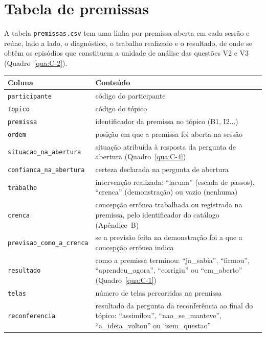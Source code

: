 \section{Tabela de premissas}

A tabela \texttt{premissas.csv} tem uma linha por premissa aberta em cada sessão e reúne, lado a lado, o diagnóstico, o trabalho realizado e o resultado, de onde se obtêm os episódios que constituem a unidade de análise das questões V2 e V3 (Quadro~\ref{qua:C-2}).

\begin{quadro}[htbp]
\caption{Colunas de \texttt{premissas.csv}}\label{qua:C-2}
\footnotesize
\begin{tabularx}{\textwidth}{|X|X|}
\hline
\textbf{Coluna} & \textbf{Conteúdo} \\ \hline
\texttt{participante} & código do participante \\ \hline
\texttt{topico} & código do tópico \\ \hline
\texttt{premissa} & identificador da premissa no tópico (B1, I2...) \\ \hline
\texttt{ordem} & posição em que a premissa foi aberta na sessão \\ \hline
\texttt{situacao\_\allowbreak{}na\_\allowbreak{}abertura} & situação atribuída à resposta da pergunta de abertura (Quadro~\ref{qua:C-4}) \\ \hline
\texttt{confianca\_\allowbreak{}na\_\allowbreak{}abertura} & certeza declarada na pergunta de abertura \\ \hline
\texttt{trabalho} & intervenção realizada: ``lacuna'' (escada de passos), ``crenca'' (demonstração) ou vazio (nenhuma) \\ \hline
\texttt{crenca} & concepção errônea trabalhada ou registrada na premissa, pelo identificador do catálogo (Apêndice~B) \\ \hline
\texttt{previsao\_\allowbreak{}como\_\allowbreak{}a\_\allowbreak{}crenca} & se a previsão feita na demonstração foi a que a concepção errônea indica \\ \hline
\texttt{resultado} & como a premissa terminou: ``ja\_sabia'', ``firmou'', ``aprendeu\_agora'', ``corrigiu'' ou ``em\_aberto'' (Quadro~\ref{qua:C-1}) \\ \hline
\texttt{telas} & número de telas percorridas na premissa \\ \hline
\texttt{reconferencia} & resultado da pergunta da reconferência ao final do tópico: ``assimilou'', ``nao\_se\_manteve'', ``a\_ideia\_voltou'' ou ``sem\_questao'' \\ \hline
\end{tabularx}
\end{quadro}

